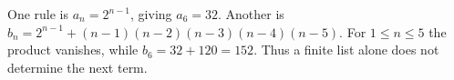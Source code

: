 One rule is $a_n=2^{n-1}$, giving $a_6=32$. Another is $b_n=2^{n-1}+(n-1)(n-2)(n-3)(n-4)(n-5)$. For $1\le n\le5$ the product vanishes, while $b_6=32+120=152$. Thus a finite list alone does not determine the next term.
